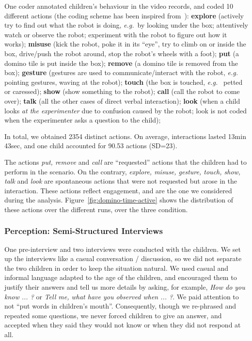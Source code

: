 \documentclass[letterpaper, 10pt, conference]{ieeeconf}
\newcommand{\eg}{{\textit{e.g.~}}}
\begin{document}
One coder annotated children's behaviour in the video records, and coded 10 different
actions (the coding scheme has been inspired from~\cite{fink2014which}):
\textbf{explore} (actively try to find out what the robot is doing, \eg by
looking under the box; attentively watch or observe the robot; experiment with
the robot to figure out how it works); \textbf{misuse} (kick the robot, poke it
in its ``eye'', try to climb on or inside the box, drive/push the robot around,
stop the robot's wheels with a foot); \textbf{put} (a domino tile is put inside
the box); \textbf{remove} (a domino tile is removed from the box);
\textbf{gesture} (gestures are used to communicate/interact with the robot, \eg
pointing gestures, waving at the robot); \textbf{touch} (the box is touched, \eg
petted or caressed); \textbf{show} (show something to the robot); \textbf{call}
(call the robot to come over); \textbf{talk} (all the other cases of direct
verbal interaction); \textbf{look} (when a child looks \emph{at the
experimenter} due to confusion caused by the robot; look is not coded when the
experimenter asks a question to the child);


In total, we obtained 2354 distinct actions. On average, interactions lasted
13min 43sec, and one child accounted for 90.53 actions (SD=23).

The actions \textit{put, remove} and \textit{call} are ``requested'' actions
that the children had to perform in the scenario. On the contrary,
\textit{explore, misuse, gesture, touch, show, talk} and \textit{look} are
spontaneous actions that were not requested but arose in the interaction.  These
actions reflect engagement, and are the one we considered during the analysis.
Figure~\ref{fig:domino-time-active} shows the distribution of these actions over
the different runs, over the three condition.

\subsubsection{Perception: Semi-Structured Interviews}

One pre-interview and two interviews were conducted with the children.  We set
up the interviews like a casual conversation / discussion, so we did not
separate the two children in order to keep the situation natural. We used casual
and informal language adapted to the age of the children, and encouraged them to
justify their answers and tell us more details by asking, for example,
\textit{How do you know ... ?} or \textit{Tell me, what have you observed when
... ?}. We paid attention to not ``put words in children's mouth''.
Consequently, though we re-phrased and repeated some questions, we never forced
children to give an answer, and accepted when they said they would not know or
when they did not respond at all.	
\end{document}

